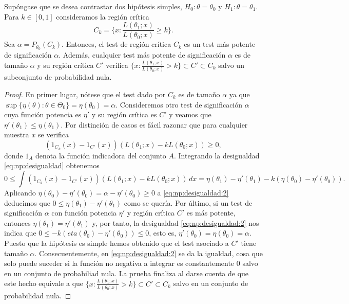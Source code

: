         \begin{thm} \label{thm:np:1}
            Supóngase que se desea contrastar dos hipótesis simples, $H_0 : \theta = \theta_0$ y $H_1 : \theta = \theta_1$. Para $k \in [0,1]$ consideramos la región crítica
            \[C_k = \{x: \frac{L(\theta_1;x)}{L(\theta_0;x)} \ge k\}.\]
            Sea $\alpha = P_{\theta_0}(C_k)$. Entonces, el test de región crítica $C_k$ es un test más potente de significación $\alpha$. Además, cualquier test más potente de significación $\alpha$ es de tamaño $\alpha$ y su región crítica $C'$ verifica $\{x: \frac{L(\theta_1;x)}{L(\theta_0;x)} > k\} \subset C' \subset C_k$ salvo un subconjunto de probabilidad nula.
        \end{thm}
        \begin{proof}
            En primer lugar, nótese que el test dado por $C_k$ es de tamaño $\alpha$ ya que $\sup\{ \eta(\theta) : \theta \in \Theta_0\} = \eta(\theta_0) = \alpha$. Consideremos otro test de significación $\alpha$ cuya función potencia es $\eta'$ y su región crítica es $C'$ y veamos que $\eta'(\theta_1) \le \eta(\theta_1)$. Por distinción de casos es fácil razonar que para cualquier muestra $x$ se verifica
            \begin{equation} \label{eq:np:desigualdad}
                (1_{C_k}(x)-1_{C'}(x)) (L(\theta_1; x) - k L(\theta_0; x)) \ge 0,
            \end{equation}
            donde $1_A$ denota la función indicadora del conjunto $A$. Integrando la desigualdad \eqref{eq:np:desigualdad} obtenemos
            \begin{equation} \label{eq:np:desigualdad:2}
                0 \le \int(1_{C_k}(x)-1_{C'}(x)) (L(\theta_1; x) - k L(\theta_0; x)) \, dx = \eta(\theta_1) - \eta'(\theta_1) - k (\eta(\theta_0) - \eta'(\theta_0)).
            \end{equation}
            Aplicando $\eta(\theta_0) - \eta'(\theta_0) = \alpha  - \eta'(\theta_0) \ge 0$ a \eqref{eq:np:desigualdad:2} deducimos que $0 \le \eta(\theta_1) - \eta'(\theta_1)$ como se quería. Por último, si un test de significación $\alpha$ con función potencia $\eta'$ y región crítica $C'$ es más potente, entonces $\eta(\theta_1) = \eta'(\theta_1)$ y, por tanto, la desigualdad \eqref{eq:np:desigualdad:2} nos indica que $0 \le -k(eta(\theta_0) - \eta'(\theta_0)) \le 0$, esto es, $\eta'(\theta_0) = \eta(\theta_0) = \alpha$. Puesto que la hipótesis es simple hemos obtenido que el test asociado a $C'$ tiene tamaño $\alpha$. Consecuentemente, en \eqref{eq:np:desigualdad:2} se da la igualdad, cosa que solo puede suceder si la función no negativa a integrar es constantemente 0 salvo en un conjunto de probabiliad nula. La prueba finaliza al darse cuenta de que este hecho equivale a que $\{x: \frac{L(\theta_1;x)}{L(\theta_0;x)} > k\} \subset C' \subset C_k$ salvo en un conjunto de probabilidad nula.
        \end{proof}

